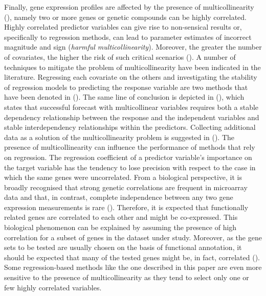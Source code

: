Finally, gene expression profiles are affected by the presence of multicollinearity (\citealp{est_multicoll, ml_multicoll}), namely two or more genes or genetic compounds can be highly correlated. Highly correlated predictor variables can give rise to non-sensical results or, specifically to regression methods, can lead to parameter estimates of incorrect magnitude and sign (\emph{harmful multicollinearity}). Moreover, the greater the number of covariates, the higher the risk of such critical scenarios (\citealp{multicollinearity_kvs}).  
A number of techniques to mitigate the problem of multicollinearity have been indicated in the literature. Regressing each covariate on the others and investigating the stability of regression models to predicting the response variable are two methods that have been denoted in (\citealp{multicollinearity_kvs}). The same line of conclusion is depicted in (\citealp{farrar1964multicollinearity}), which states that successful forecast with multicollinear variables requires both a stable dependency relationship between the response and the independent variables and stable interdependency relationships within the predictors. Collecting additional data as a solution of the multicollinearity problem is suggested in (\citealp{multicollinearity_kvs, farrar1964multicollinearity}).
The presence of multicollinearity can influence the performance of methods that rely on regression. The regression coefficient of a predictor variable's importance on the target variable has the tendency to lose precision with respect to the case in which the same genes were uncorrelated. 
From a biological perspective, it is broadly recognised that strong genetic correlations are frequent in microarray data and that, in contrast, complete independence between any two gene expression measurements is rare (\citealp{Goeman2007}). Therefore, it is expected that functionally related genes are correlated to each other and might be co-expressed. This biological phenomenon can be explained by assuming the presence of high correlation for a subset of genes in the dataset under study. Moreover, as the gene sets to be tested are usually chosen on the basis of functional annotation, it should be expected that many of the tested genes might be, in fact, correlated (\citealp{genesets}).
Some regression-based methods like the one described in this paper are even more sensitive to the presence of multicollinearity as they tend to select only one or few highly correlated variables.

